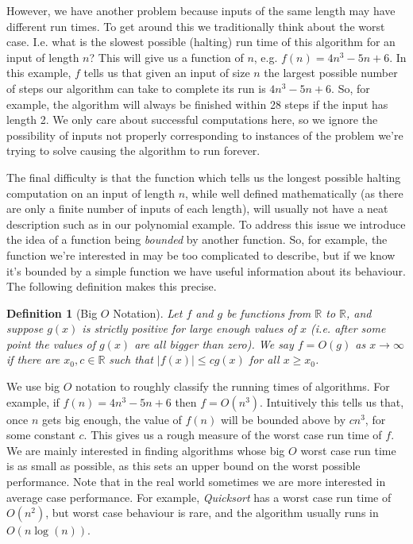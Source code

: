 \documentclass{article}
\theoremstyle{plain}
\newtheorem{definition}[theorem]{Definition}{\bfseries}{\upshape}
\theoremstyle{definition}
\newcommand{\ra}{\rightarrow}
\begin{document}
However, we have another problem because inputs of the same length may have different run times. To get around this we traditionally think about the worst case. I.e. what is the slowest possible (halting) run time of this algorithm for an input of length $n$? This will give us a function of $n$, e.g. $f(n)=4n^3-5n +6$. In this example, $f$ tells us that given an input of size $n$ the largest possible number of steps our algorithm can take to complete its run is $4n^3-5n +6$. So, for example, the algorithm will always be finished within 28 steps if the input has length 2. We only care about successful computations here, so we ignore the possibility of inputs not properly corresponding to instances of the problem we're trying to solve causing the algorithm to run forever.

The final difficulty is that the function which tells us the longest possible halting computation on an input of length $n$, while well defined mathematically (as there are only a finite number of inputs of each length), will usually not have a neat description such as in our polynomial example. To address this issue we introduce the idea of a function being \emph{bounded} by another function. So, for example, the function we're interested in may be too complicated to describe, but if we know it's bounded by a simple function we have useful information about its behaviour. The following definition makes this precise. 

\begin{definition}[Big $O$ Notation]
Let $f$ and $g$ be functions from $\mathbb{R}$ to $\mathbb{R}$, and suppose $g(x)$ is strictly positive for large enough values of $x$ (i.e. after some point the values of $g(x)$ are all bigger than zero). We say $f=O(g)$ as $x\ra\infty$ if there are $x_0,c\in\mathbb{R}$ such that $|f(x)|\leq cg(x)$ for all $x\geq x_0$. 
\end{definition}

We use big $O$ notation to roughly classify the running times of algorithms. For example, if $f(n)=4n^3-5n +6$ then $f=O(n^3)$. Intuitively this tells us that, once $n$ gets big enough, the value of $f(n)$ will be bounded above by $cn^3$, for some constant $c$. This gives us a rough measure of the worst case run time of $f$. We are mainly interested in finding algorithms whose big $O$ worst case run time is as small as possible, as this sets an upper bound on the worst possible performance. Note that in the real world sometimes we are more interested in average case performance. For example, \emph{Quicksort} has a worst case run time of $O(n^2)$, but worst case behaviour is rare, and the algorithm usually runs in $O(n\log(n))$. 
\end{document}
